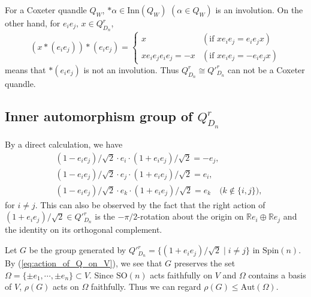 \documentclass{amsart}
\theoremstyle{definition}
\theoremstyle{remark}
\numberwithin{equation}{section}
\begin{document}
For a Coxeter quandle $Q_W$, $*\alpha \in \mathrm{Inn}(Q_W)$ $(\alpha \in Q_W)$ 
is an involution. 
On the other hand, for $e_ie_j, \, x \in Q^r_{D_n}$, 
\[
(x * (e_i e_j))* (e_i e_j)
= \begin{cases} 
x & (\textrm{if $x e_ie_j = e_ie_j x$}) \\
x e_i e_j e_i e_j = -x & (\textrm{if $x e_ie_j = - e_ie_j x$})
\end{cases}
\]
means that $*(e_i e_j)$ is not an involution.
Thus $Q^r_{D_n} \cong Q'^r_{D_n}$ can not be a Coxeter quandle.

\subsection{Inner automorphism group of $Q^r_{D_n}$}
By a direct calculation, we have
\begin{equation}
\label{eq:action_of_Q_on_V}
\begin{split}
&(1 - e_i e_j)/\sqrt{2} \cdot e_i \cdot (1 + e_i e_j)/\sqrt{2} = -e_j, \\
&(1 - e_i e_j)/\sqrt{2} \cdot e_j \cdot (1 + e_i e_j)/\sqrt{2} = e_i, \\
&(1 - e_i e_j)/\sqrt{2} \cdot e_k \cdot (1 + e_i e_j)/\sqrt{2} = e_k 
\quad \textrm{($k \notin \{ i, j \}$)},
\end{split}
\end{equation}
for $i \neq j$.
This can also be observed by the fact that the right action of 
$(1 + e_i e_j)/\sqrt{2} \in Q'^r_{D_n}$ is the $-\pi/2$-rotation about the origin 
on $\mathbb{R} e_i \oplus \mathbb{R} e_j$
and the identity on its orthogonal complement.

Let $G$ be the group generated by $Q'^r_{D_n} = \{ (1 + e_i e_j)/\sqrt{2} \mid i \neq j \}$ 
in $\mathrm{Spin}(n)$.
By (\ref{eq:action_of_Q_on_V}), 
we see that $G$ preserves the set $\Omega = \{ \pm e_1, \cdots , \pm e_n\} \subset V$.
Since $\mathrm{SO}(n)$ acts faithfully on $V$ and $\Omega$ contains a basis of $V$, 
$\rho(G)$ acts on $\Omega$ faithfully. 
Thus we can regard $\rho(G) \leq \mathrm{Aut}(\Omega)$.
\end{document}
